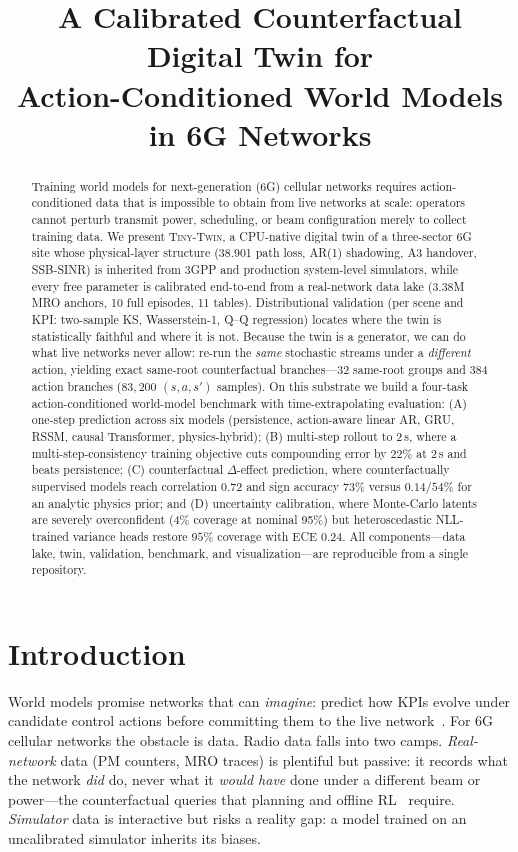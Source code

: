 \documentclass[10pt,conference]{IEEEtran}
\title{A Calibrated Counterfactual Digital Twin for\\ Action-Conditioned World Models in 6G Networks}
\author{\IEEEauthorblockN{Anonymous}
\IEEEauthorblockA{Manuscript under preparation --- November 2026}}
\newcommand{\twin}{\textsc{Tiny-Twin}}
\begin{document}
\maketitle

\begin{abstract}
Training world models for next-generation (6G) cellular networks requires action-conditioned data that is impossible to obtain from live networks at scale: operators cannot perturb transmit power, scheduling, or beam configuration merely to collect training data.
We present \twin{}, a CPU-native digital twin of a three-sector 6G site whose physical-layer structure (38.901 path loss, AR(1) shadowing, A3 handover, SSB-SINR) is inherited from 3GPP and production system-level simulators, while every free parameter is calibrated end-to-end from a real-network data lake (3.38M MRO anchors, 10 full episodes, 11 tables).
Distributional validation (per scene and KPI: two-sample KS, Wasserstein-1, Q--Q regression) locates where the twin is statistically faithful and where it is not.
Because the twin is a generator, we can do what live networks never allow: re-run the \emph{same} stochastic streams under a \emph{different} action, yielding exact same-root counterfactual branches---32 same-root groups and 384 action branches ($83{,}200$ $(s,a,s')$ samples).
On this substrate we build a four-task action-conditioned world-model benchmark with time-extrapolating evaluation: (A) one-step prediction across six models (persistence, action-aware linear AR, GRU, RSSM, causal Transformer, physics-hybrid); (B) multi-step rollout to 2\,s, where a multi-step-consistency training objective cuts compounding error by $22\%$ at 2\,s and beats persistence; (C) counterfactual $\Delta$-effect prediction, where counterfactually supervised models reach correlation $0.72$ and sign accuracy $73\%$ versus $0.14$/$54\%$ for an analytic physics prior; and (D) uncertainty calibration, where Monte-Carlo latents are severely overconfident (4\% coverage at nominal 95\%) but heteroscedastic NLL-trained variance heads restore $95\%$ coverage with ECE $0.24$.
All components---data lake, twin, validation, benchmark, and visualization---are reproducible from a single repository.
\end{abstract}

\section{Introduction}
World models promise networks that can \emph{imagine}: predict how KPIs evolve under candidate control actions before committing them to the live network~\cite{ha2018world,le2019world}.
For 6G cellular networks the obstacle is data.
Radio data falls into two camps.
\emph{Real-network} data (PM counters, MRO traces) is plentiful but passive: it records what the network \emph{did} do, never what it \emph{would have} done under a different beam or power---the counterfactual queries that planning and offline RL~\cite{levine2020offline} require.
\emph{Simulator} data is interactive but risks a reality gap: a model trained on an uncalibrated simulator inherits its biases.
\end{document}
